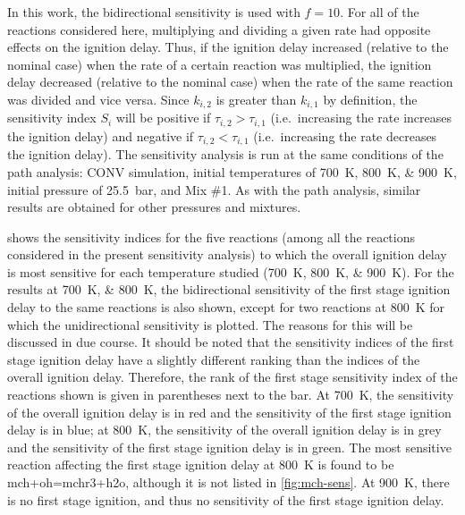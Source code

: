 \documentclass[../main.tex]{subfiles}
\begin{document}
In this work, the bidirectional sensitivity is used with $f=10$. For all of the
reactions considered here, multiplying and dividing a given rate had opposite
effects on the ignition delay. Thus, if the ignition delay increased (relative
to the nominal case) when the rate of a certain reaction was multiplied, the
ignition delay decreased (relative to the nominal case) when the rate of the
same reaction was divided and vice versa. Since $k_{i,2}$ is greater than
$k_{i,1}$ by definition, the sensitivity index $S_i$ will be positive if
$\tau_{i,2}>\tau_{i,1}$ (i.e.\ increasing the rate increases the ignition delay)
and negative if $\tau_{i,2}<\tau_{i,1}$ (i.e.\ increasing the rate decreases the
ignition delay). The sensitivity analysis is run at the same conditions of the
path analysis: CONV simulation, initial temperatures of \SIlist{700;800;900}{\kelvin},
initial pressure of \SI{25.5}{\bar}, and Mix \#1. As with the path analysis, similar
results are obtained for other pressures and mixtures.

 shows the sensitivity indices for the five reactions
(among all the reactions considered in the present sensitivity analysis) to
which the overall ignition delay is most sensitive for each temperature studied
(\SIlist{700;800;900}{\kelvin}). For the results at \SIlist{700;800}{\kelvin}, the
bidirectional sensitivity of the first stage ignition delay to the same
reactions is also shown, except for two reactions at \SI{800}{\kelvin} for which the
unidirectional sensitivity is plotted. The reasons for this will be discussed
in due course. It should be noted that the sensitivity indices of the first
stage ignition delay have a slightly different ranking than the indices of the
overall ignition delay. Therefore, the rank of the first stage sensitivity
index of the reactions shown is given in parentheses next to the bar. At \SI{700}{\kelvin},
the sensitivity of the overall ignition delay is in red and the sensitivity of
the first stage ignition delay is in blue; at \SI{800}{\kelvin}, the sensitivity of the
overall ignition delay is in grey and the sensitivity of the first stage
ignition delay is in green. The most sensitive reaction affecting the first
stage ignition delay at \SI{800}{\kelvin} is found to be mch+oh=mchr3+h2o, although it is
not listed in \cref{fig:mch-sens}. At \SI{900}{\kelvin}, there is no first stage
ignition, and thus no sensitivity of the first stage ignition delay.
\end{document}
